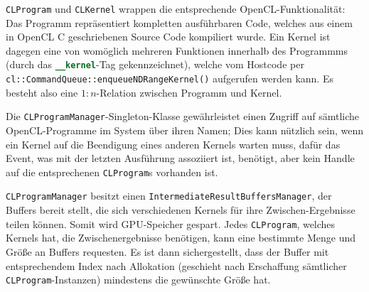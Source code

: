 	\lstinline|CLProgram| und \lstinline|CLKernel| wrappen die entsprechende OpenCL-Funktionalität:
	Das Programm repräsentiert kompletten ausführbaren Code, welches aus einem in OpenCL C geschriebenen
	Source Code kompiliert wurde. Ein Kernel ist dagegen eine von womöglich mehreren Funktionen innerhalb
	des Programmms (durch das \lstinline[language=OpenCL]|__kernel|-Tag gekennzeichnet),
	welche vom Hostcode per \lstinline|cl::CommandQueue::enqueueNDRangeKernel()| aufgerufen werden kann.
	Es besteht also eine $1:n$-Relation zwischen Programm und Kernel.
	
	Die \lstinline|CLProgramManager|-Singleton-Klasse gewährleistet einen Zugriff auf sämtliche OpenCL-Programme
	im System über ihren Namen; Dies kann nützlich sein, wenn ein Kernel auf die Beendigung eines anderen Kernels
	warten muss, dafür das Event, was mit der letzten Ausführung assoziiert ist, benötigt, aber kein Handle auf die 
	entsprechenen \lstinline|CLProgram|s vorhanden ist.
	
	\lstinline|CLProgramManager| besitzt einen \lstinline|IntermediateResultBuffersManager|, der Buffers bereit stellt,
	die sich verschiedenen Kernels für ihre Zwischen-Ergebnisse teilen können. Somit wird GPU-Speicher gespart.
	Jedes \lstinline|CLProgram|, welches Kernels hat, die Zwischenergebnisse benötigen, kann eine bestimmte Menge
	und Größe an Buffers requesten. Es ist dann sichergestellt, dass der Buffer mit entsprechendem Index nach 
	Allokation (geschieht nach Erschaffung sämtlicher \lstinline|CLProgram|-Instanzen) mindestens die
	gewünschte Größe hat.
	 
	
		
